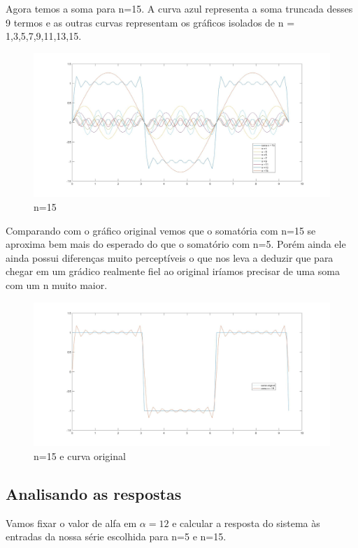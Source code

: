 \documentclass[a4paper,12pt,twoside]{article}
\begin{document}
Agora temos a soma para n=15. A curva azul representa a soma truncada desses 9 termos e as outras curvas representam os gráficos isolados de n = 1,3,5,7,9,11,13,15.
\begin{figure}[H]
\centering
\includegraphics[scale=0.25]{n=15.jpg}
\caption{n=15}
\label{fig:n=15}
\end{figure}

Comparando com o gráfico original vemos que o somatória com n=15 se aproxima bem mais do esperado do que o somatório com n=5. Porém ainda ele ainda possui diferenças muito perceptíveis o que nos leva a deduzir que para chegar em um grádico realmente fiel ao original iríamos precisar de uma soma com um n muito maior.
\begin{figure}[H]
\centering
\includegraphics[scale=0.25]{n=15somaoriginal.jpg}
\caption{n=15 e curva original}
\label{fig:n=15 e curva original}
\end{figure}

\subsection{Analisando as respostas}

Vamos fixar o valor de alfa em $\alpha = 12$ e calcular a resposta do sistema às entradas da nossa série escolhida para n=5 e n=15.
\end{document}
